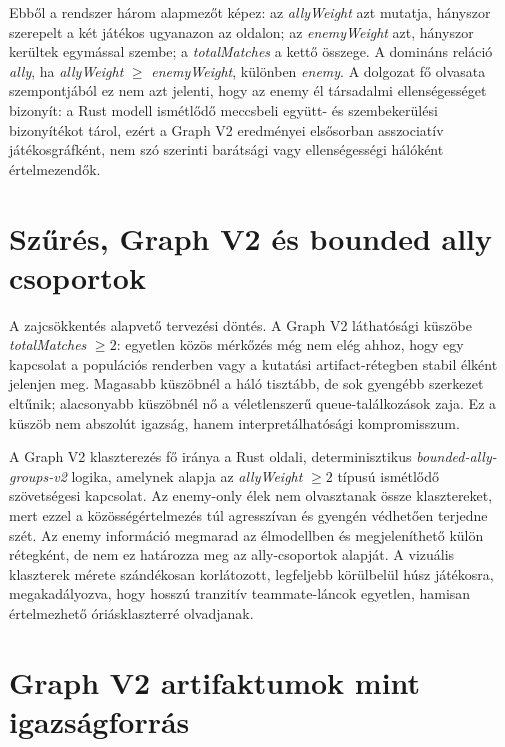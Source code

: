 Ebből a rendszer három alapmezőt képez: az \textit{allyWeight} azt mutatja, hányszor szerepelt a két játékos ugyanazon az oldalon; az \textit{enemyWeight} azt, hányszor kerültek egymással szembe; a \textit{totalMatches} a kettő összege. A domináns reláció \textit{ally}, ha \textit{allyWeight} $\geq$ \textit{enemyWeight}, különben \textit{enemy}. A dolgozat fő olvasata szempontjából ez nem azt jelenti, hogy az enemy él társadalmi ellenségességet bizonyít: a Rust modell ismétlődő meccsbeli együtt- és szembekerülési bizonyítékot tárol, ezért a Graph V2 eredményei elsősorban asszociatív játékosgráfként, nem szó szerinti barátsági vagy ellenségességi hálóként értelmezendők.

\section{Szűrés, Graph V2 és bounded ally csoportok}

A zajcsökkentés alapvető tervezési döntés. A Graph V2 láthatósági küszöbe \textit{totalMatches} $\geq 2$: egyetlen közös mérkőzés még nem elég ahhoz, hogy egy kapcsolat a populációs renderben vagy a kutatási artifact-rétegben stabil élként jelenjen meg. Magasabb küszöbnél a háló tisztább, de sok gyengébb szerkezet eltűnik; alacsonyabb küszöbnél nő a véletlenszerű queue-találkozások zaja. Ez a küszöb nem abszolút igazság, hanem interpretálhatósági kompromisszum.

A Graph V2 klaszterezés fő iránya a Rust oldali, determinisztikus \textit{bounded-ally-groups-v2} logika, amelynek alapja az \textit{allyWeight} $\geq 2$ típusú ismétlődő szövetségesi kapcsolat. Az enemy-only élek nem olvasztanak össze klasztereket, mert ezzel a közösségértelmezés túl agresszívan és gyengén védhetően terjedne szét. Az enemy információ megmarad az élmodellben és megjeleníthető külön rétegként, de nem ez határozza meg az ally-csoportok alapját. A vizuális klaszterek mérete szándékosan korlátozott, legfeljebb körülbelül húsz játékosra, megakadályozva, hogy hosszú tranzitív teammate-láncok egyetlen, hamisan értelmezhető óriásklaszterré olvadjanak.

\section{Graph V2 artifaktumok mint igazságforrás}

